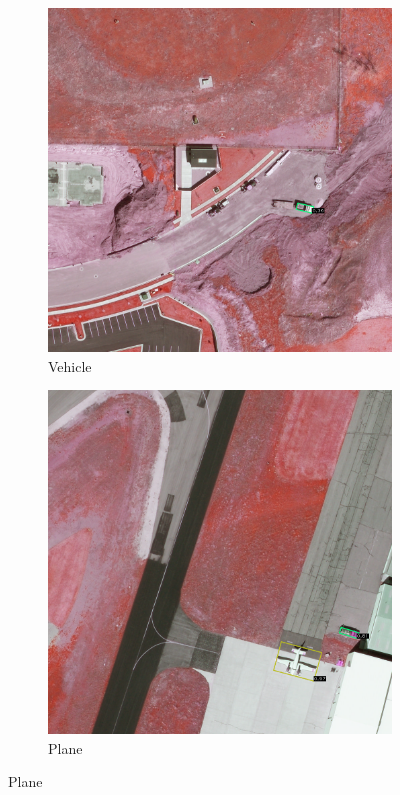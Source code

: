 \begin{figure}[h!]
    \begin{subfigure}[t]{0.38\textwidth}
        \centering
        \includegraphics[width=\linewidth]{images/015Results/02perm_exp/comp_images/rgir/427.png}
        \caption{Vehicle}
    \end{subfigure}
    \begin{subfigure}[t]{0.38\textwidth}
        \centering
        \includegraphics[width=\linewidth]{images/015Results/02perm_exp/comp_images/rgir/487.png}
        \caption{Plane}
    \end{subfigure}
    

\end{figure}
